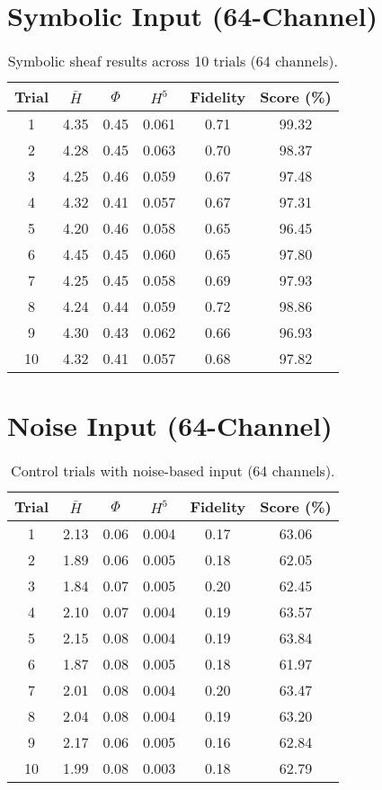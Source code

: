 \documentclass{article}
\begin{document}
\section*{Symbolic Input (64-Channel)}
\begin{table}[ht]
\centering
\begin{tabular}{|c|c|c|c|c|c|}
\hline
Trial & $\bar{H}$ & $\Phi$ & $H^5$ & Fidelity & Score (\%) \\ \hline
1 & 4.35 & 0.45 & 0.061 & 0.71 & 99.32 \\ \hline
2 & 4.28 & 0.45 & 0.063 & 0.70 & 98.37 \\ \hline
3 & 4.25 & 0.46 & 0.059 & 0.67 & 97.48 \\ \hline
4 & 4.32 & 0.41 & 0.057 & 0.67 & 97.31 \\ \hline
5 & 4.20 & 0.46 & 0.058 & 0.65 & 96.45 \\ \hline
6 & 4.45 & 0.45 & 0.060 & 0.65 & 97.80 \\ \hline
7 & 4.25 & 0.45 & 0.058 & 0.69 & 97.93 \\ \hline
8 & 4.24 & 0.44 & 0.059 & 0.72 & 98.86 \\ \hline
9 & 4.30 & 0.43 & 0.062 & 0.66 & 96.93 \\ \hline
10 & 4.32 & 0.41 & 0.057 & 0.68 & 97.82 \\ \hline
\end{tabular}
\caption{Symbolic sheaf results across 10 trials (64 channels).}
\end{table}

\section*{Noise Input (64-Channel)}
\begin{table}[ht]
\centering
\begin{tabular}{|c|c|c|c|c|c|}
\hline
Trial & $\bar{H}$ & $\Phi$ & $H^5$ & Fidelity & Score (\%) \\ \hline
1 & 2.13 & 0.06 & 0.004 & 0.17 & 63.06 \\ \hline
2 & 1.89 & 0.06 & 0.005 & 0.18 & 62.05 \\ \hline
3 & 1.84 & 0.07 & 0.005 & 0.20 & 62.45 \\ \hline
4 & 2.10 & 0.07 & 0.004 & 0.19 & 63.57 \\ \hline
5 & 2.15 & 0.08 & 0.004 & 0.19 & 63.84 \\ \hline
6 & 1.87 & 0.08 & 0.005 & 0.18 & 61.97 \\ \hline
7 & 2.01 & 0.08 & 0.004 & 0.20 & 63.47 \\ \hline
8 & 2.04 & 0.08 & 0.004 & 0.19 & 63.20 \\ \hline
9 & 2.17 & 0.06 & 0.005 & 0.16 & 62.84 \\ \hline
10 & 1.99 & 0.08 & 0.003 & 0.18 & 62.79 \\ \hline
\end{tabular}
\caption{Control trials with noise-based input (64 channels).}
\end{table}
\end{document}
